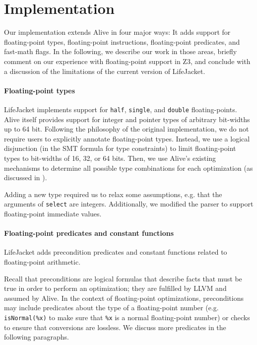 \documentclass[preprint, numbers]{sigplanconf}
\newcommand{\xxx}{LifeJacket}
\begin{document}
\section{Implementation} \label{sec:implementation}
Our implementation extends Alive in four major ways: It adds support for
floating-point types, floating-point instructions, floating-point predicates,
and fast-math flags. In the following, we describe our work in those areas,
briefly comment on our experience with floating-point support in Z3, and
conclude with a discussion of the limitations of the current version of \xxx{}.

\paragraph{Floating-point types}
\xxx{} implements support for \texttt{half}, \texttt{single}, and
\texttt{double} floating-points.
Alive itself provides support for integer and pointer types of arbitrary
bit-widths up to 64 bit. Following the philosophy of the original implementation,
we do not require users to explicitly annotate floating-point types. Instead,
we use a logical disjunction (in the SMT formula for type constraints)
to limit floating-point types to bit-widths of 16, 32, or 64 bits. Then, we use
Alive's existing mechanisms to determine all possible type combinations for each
optimization (as discussed in ). 

Adding a new type required us to relax some assumptions, e.g. that the
arguments of \texttt{select} are integers. Additionally, we modified the parser
to support floating-point immediate values.

\paragraph{Floating-point predicates and constant functions} \xxx{} adds
precondition predicates and constant functions related to floating-point
arithmetic.

Recall that preconditions are logical formulas that describe facts that must be
true in order to perform an optimization; they are fulfilled by LLVM and
assumed by Alive. In the context of floating-point optimizations, preconditions
may include predicates about the type of a floating-point number (e.g.
\texttt{isNormal(\%x)} to make sure that \texttt{\%x} is a normal
floating-point number) or checks to ensure that conversions are lossless. We
discuss more predicates in the following paragraphs.
\end{document}
